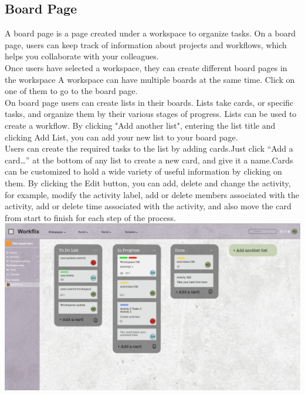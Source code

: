 \subsection{Board Page}

A board page is a page created under a workspace to organize tasks. On a board page, users can keep track of information
about projects and workflows, which helps you collaborate with your colleagues.\\

Once users have selected a workspace, they can create different board pages in the workspace A workspace can have multiple
boards at the same time. Click on one of them to go to the board page.\\

On board page users can create lists in their boards. Lists take cards, or specific tasks, and organize them by their
various stages of progress. Lists can be used to create a workflow. By clicking "Add another list", entering the list
title and clicking Add List, you can add your new list to your board page.\\

Users can create the required tasks to the list by adding cards.Just click “Add a card…” at the bottom of any list to create
a new card, and give it a name.Cards can be customized to hold a wide variety of useful information by clicking on them. By
clicking the Edit button, you can add, delete and change the activity, for example, modify the activity label, add or delete
members associated with the activity, add or delete time associated with the activity, and also move the card from start to
finish for each step of the process.
\includegraphics[width=\columnwidth]{images/Board.jpg}







